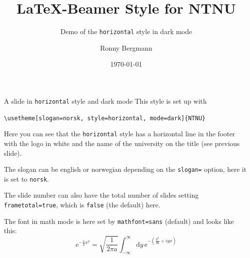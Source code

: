 \documentclass[aspectratio=169]{beamer}
\title{\LaTeX{}-Beamer Style for NTNU}
\subtitle{Demo of the  \texttt{horizontal} style in dark mode}
\author{Ronny Bergmann}
\date{\today}
\begin{document}
	\maketitle
    \begin{frame}[fragile]{A slide in \texttt{horizontal} style and dark mode}
        This style is set up with

        \lstinline!\usetheme[slogan=norsk, style=horizontal, mode=dark]{NTNU}!

        Here you can see that the \texttt{horizontal} style has a horizontal line in the footer with the logo in white and the name of the university on the title (see previous slide).

        The slogan can be english or norwegian depending on the \lstinline!slogan=! option, here it is set to \lstinline!norsk!.

        The slide number can also have the total number of slides setting \lstinline!frametotal=true!, which is \lstinline!false! (the default) here.

        The font in math mode is here set by \lstinline!mathfont=sans! (default) and looks like this: \[\mathrm{e}^{-\frac{a}{2}x^2} = \sqrt{\frac{1}{2\pi a}} \int_{-\infty}^\infty\mathrm{d}y\, \mathrm{e}^{-\left(\frac{y^2}{2a} +iy x\right)}\]
    \end{frame}
\end{document}
